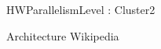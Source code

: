 \begin{Frame}{HWParallelismLevel : Cluster2}

			\begin{block}{Architecture Wikipedia}
		\end{block}

\end{Frame}

